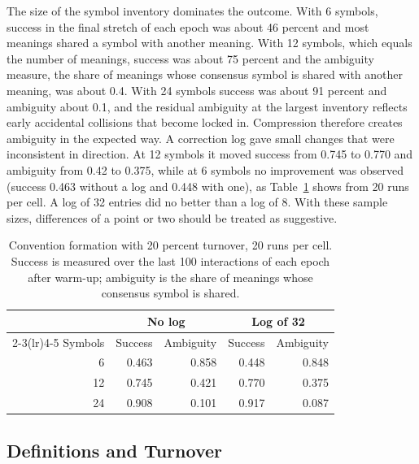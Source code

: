 \documentclass[11pt]{article}
\begin{document}
The size of the symbol inventory dominates the outcome. With 6 symbols, success in the final stretch of each epoch was about 46 percent and most meanings shared a symbol with another meaning. With 12 symbols, which equals the number of meanings, success was about 75 percent and the ambiguity measure, the share of meanings whose consensus symbol is shared with another meaning, was about 0.4. With 24 symbols success was about 91 percent and ambiguity about 0.1, and the residual ambiguity at the largest inventory reflects early accidental collisions that become locked in. Compression therefore creates ambiguity in the expected way. A correction log gave small changes that were inconsistent in direction. At 12 symbols it moved success from 0.745 to 0.770 and ambiguity from 0.42 to 0.375, while at 6 symbols no improvement was observed (success 0.463 without a log and 0.448 with one), as Table~\ref{tab:lang} shows from 20 runs per cell. A log of 32 entries did no better than a log of 8. With these sample sizes, differences of a point or two should be treated as suggestive.

\begin{table}[ht]
\centering
\caption{Convention formation with 20 percent turnover, 20 runs per cell. Success is measured over the last 100 interactions of each epoch after warm-up; ambiguity is the share of meanings whose consensus symbol is shared.}
\label{tab:lang}
\begin{tabular}{rrrrr}
\toprule
 & \multicolumn{2}{c}{No log} & \multicolumn{2}{c}{Log of 32}\\
\cmidrule(lr){2-3}\cmidrule(lr){4-5}
Symbols & Success & Ambiguity & Success & Ambiguity\\
\midrule
6 & 0.463 & 0.858 & 0.448 & 0.848\\
12 & 0.745 & 0.421 & 0.770 & 0.375\\
24 & 0.908 & 0.101 & 0.917 & 0.087\\
\bottomrule
\end{tabular}
\end{table}

\subsection{Definitions and Turnover}
\end{document}
